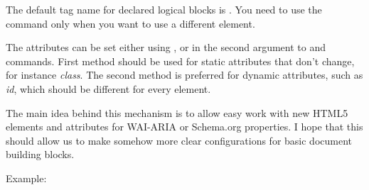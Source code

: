 The default tag name for declared logical blocks is . You
need to use the  command only when you want to use a different
element.

The attributes can be set either using , or in the second
argument to   and  commands. First method should be
used for static attributes that don't change, for instance \textit{class}. The second method
is preferred for dynamic attributes, such as \textit{id}, which should be different for 
every element.

The main idea behind this mechanism is to allow easy work with new HTML5
elements and attributes for WAI-ARIA or Schema.org properties. I hope that
this should allow us to make somehow more clear configurations for basic
document building blocks.

Example:


\begin{texsource}



{\NoFonts{}}
{\EndNoFonts}

{}
{\NoFonts{}}
{\EndNoFonts}
\end{texsource}






